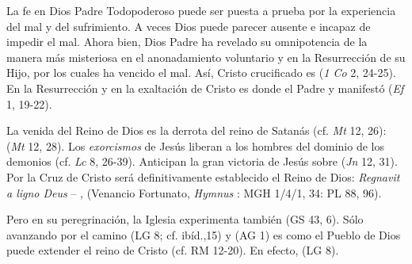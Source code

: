 \begin{ccebody}

 La fe en Dios Padre Todopoderoso puede ser puesta a prueba por la experiencia del mal y del sufrimiento. A veces Dios puede parecer ausente e incapaz de impedir el mal. Ahora bien, Dios Padre ha revelado su omnipotencia de la manera más misteriosa en el anonadamiento voluntario y en la Resurrección de su Hijo, por los cuales ha vencido el mal. Así, Cristo crucificado es  (\textit{1 Co} 2, 24-25). En la Resurrección y en la exaltación de Cristo es donde el Padre  y manifestó  (\textit{Ef} 1, 19-22).

 La venida del Reino de Dios es la derrota del reino de Satanás (cf. \textit{Mt} 12, 26):  (\textit{Mt} 12, 28). Los \textit{exorcismos} de Jesús liberan a los hombres del dominio de los demonios (cf. \textit{Lc} 8, 26-39). Anticipan la gran victoria de Jesús sobre  (\textit{Jn} 12, 31). Por la Cruz de Cristo será definitivamente establecido el Reino de Dios: \textit{Regnavit a ligno Deus} – , (Venancio Fortunato, \textit{Hymnus }: MGH 1/4/1, 34: PL 88, 96).

 Pero en su peregrinación, la Iglesia experimenta también  (GS 43, 6). Sólo avanzando por el camino  (LG 8; cf. ibíd.,15) y  (AG 1) es como el Pueblo de Dios puede extender el reino de Cristo (cf. RM 12-20). En efecto,  (LG 8).
\end{ccebody}

